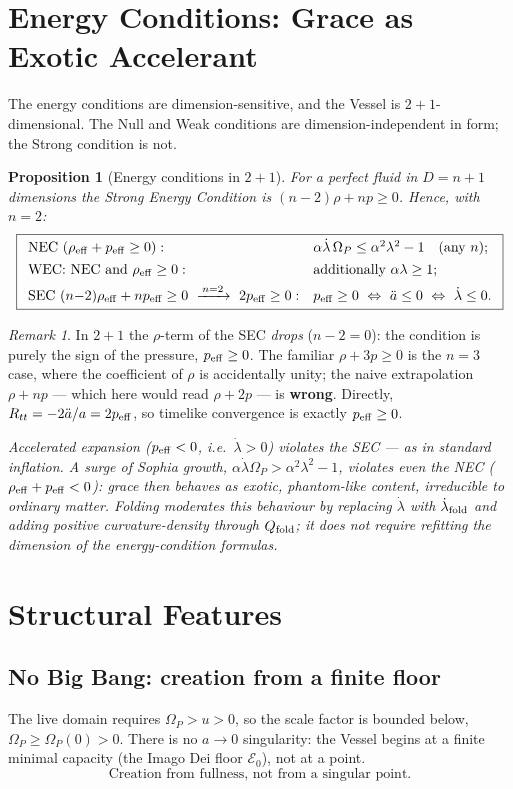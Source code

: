 \documentclass[11pt,a4paper]{article}
\newcommand{\Op}{\Omega_P}
\newcommand{\reff}{\rho_{\rm eff}}
\newcommand{\peff}{p_{\rm eff}}
\newcommand{\Qfold}{Q_{\rm fold}}
\newcommand{\note}[1]{\textcolor{black!65}{\emph{#1}}}
\theoremstyle{plain}
\newtheorem{proposition}{Proposition}
\theoremstyle{remark}
\newtheorem*{remark}{Remark}
\theoremstyle{definition}
\begin{document}
\section{Energy Conditions: Grace as Exotic Accelerant}
The energy conditions are dimension-sensitive, and the Vessel is $2{+}1$-dimensional. The Null and
Weak conditions are dimension-independent in form; the Strong condition is not.
\begin{proposition}[Energy conditions in $2{+}1$]\label{prop:ec}
For a perfect fluid in $D=n{+}1$ dimensions the Strong Energy Condition is $(n-2)\rho+np\ge0$. Hence,
with $n=2$:
\[
\boxed{\begin{array}{ll}
\textnormal{NEC }(\reff+\peff\ge0): & \alpha\dot\lambda\,\Op\le\alpha^2\lambda^2-1\quad(\text{any }n);\\[4pt]
\textnormal{WEC: NEC and }\reff\ge0: & \text{additionally }\alpha\lambda\ge1;\\[4pt]
\textnormal{SEC }(n{-}2)\reff+n\peff\ge0\ \xrightarrow{\,n=2\,}\ 2\peff\ge0: &
\peff\ge0\ \Leftrightarrow\ \ddot a\le0\ \Leftrightarrow\ \dot\lambda\le0.
\end{array}}
\]
\end{proposition}
\begin{remark}
In $2{+}1$ the $\rho$-term of the SEC \emph{drops} ($n-2=0$): the condition is purely the sign of the
pressure, $\peff\ge0$. The familiar $\rho+3p\ge0$ is the $n=3$ case, where the coefficient of $\rho$ is
accidentally unity; the naive extrapolation $\rho+np$ --- which here would read $\rho+2p$ --- is
\textbf{wrong}. Directly, $R_{tt}=-2\ddot a/a=2\peff$, so timelike convergence is exactly $\peff\ge0$.
\end{remark}
\note{Accelerated expansion ($\peff<0$, i.e.\ $\dot\lambda>0$) violates the SEC --- as in standard
inflation. A surge of Sophia growth, $\alpha\dot\lambda\Op>\alpha^2\lambda^2-1$, violates even the NEC
($\reff+\peff<0$): grace then behaves as \emph{exotic, phantom-like} content, irreducible to ordinary
matter. Folding moderates this behaviour by replacing $\dot\lambda$ with $\dot\lambda_{\rm fold}$ and
adding positive curvature-density through $\Qfold$; it does not require refitting the dimension of the
energy-condition formulas.}

\section{Structural Features}

\subsection*{No Big Bang: creation from a finite floor}
The live domain requires $\Op>u>0$, so the scale factor is bounded below, $\Op\ge\Op(0)>0$. There is no
$a\to0$ singularity: the Vessel begins at a finite minimal capacity (the Imago Dei floor $\mathcal
E_0$), not at a point.
\[
\boxed{\text{Creation from fullness, not from a singular point.}}
\]
\end{document}
